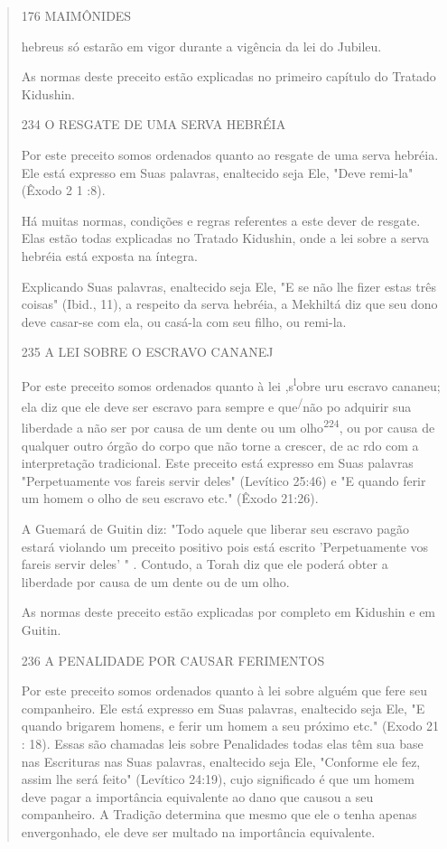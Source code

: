 \begin{quote}
176 MAIMÔNIDES

hebreus só estarão em vigor durante a vigência da lei do Jubileu.

As normas deste preceito estão explicadas no primeiro capítulo do
Tratado Kidushin.

234 O RESGATE DE UMA SERVA HEBRÉIA

Por este preceito somos ordenados quanto ao resgate de uma serva
hebréia. Ele está expresso em Suas palavras, enaltecido seja Ele, "Deve
remi-la" (Êxodo 2 1 :8).

Há muitas normas, condições e regras referentes a este dever de
res­gate. Elas estão todas explicadas no Tratado Kidushin, onde a lei
sobre a serva hebréia está exposta na íntegra.

Explicando Suas palavras, enaltecido seja Ele, "E se não lhe fizer
es­tas três coisas" (Ibid., 11), a respeito da serva hebréia, a Mekhiltá
diz que seu dono deve casar-se com ela, ou casá-la com seu filho, ou
remi-la.

235 A LEI SOBRE O ESCRAVO CANANEJ

Por este preceito somos ordenados quanto à lei ,s\textsuperscript{l}obre
uru escravo cananeu; ela diz que ele deve ser escravo para sempre e
que\textsuperscript{/}não po adquirir sua liberdade a não ser por causa
de um dente ou um olho\textsuperscript{224}, ou por causa de qualquer
outro órgão do corpo que não torne a crescer, de ac rdo com a
interpretação tradicional. Este preceito está expresso em Suas palavras
"Perpe­tuamente vos fareis servir deles" (Levítico 25:46) e "E quando
ferir um homem o olho de seu escravo etc." (Êxodo 21:26).

A Guemará de Guitin diz: "Todo aquele que liberar seu escravo pa­gão
estará violando um preceito positivo pois está escrito 'Perpetuamente
vos fareis servir deles' " . Contudo, a Torah diz que ele poderá obter a
liberdade por causa de um dente ou de um olho.

As normas deste preceito estão explicadas por completo em Kidus­hin e em
Guitin.

236 A PENALIDADE POR CAUSAR FERIMENTOS

Por este preceito somos ordenados quanto à lei sobre alguém que fere seu
companheiro. Ele está expresso em Suas palavras, enaltecido seja Ele, "E
quando brigarem homens, e ferir um homem a seu próximo etc." (Exodo 21 :
18). Essas são chamadas leis sobre Penalidades todas elas têm sua base
nas Escrituras nas Suas palavras, enaltecido seja Ele, "Conforme ele
fez, assim lhe será feito" (Levítico 24:19), cujo significado é que um
homem deve pagar a im­portância equivalente ao dano que causou a seu
companheiro. A Tradição de­termina que mesmo que ele o tenha apenas
envergonhado, ele deve ser multa­do na importância equivalente.


\end{quote}
